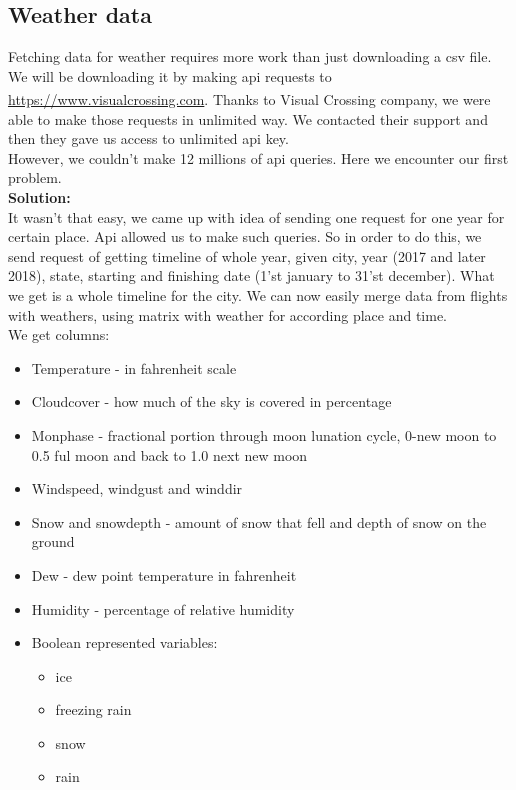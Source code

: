 \documentclass{article}
\begin{document}
	\subsection{Weather data}
		Fetching data for weather requires more work than just downloading a csv file.
		We will be downloading it by making api requests to \url{https://www.visualcrossing.com}.
		Thanks to Visual Crossing\textsuperscript{\tiny\textregistered} company, we were able to make those requests in unlimited way.
		We contacted their support and then they gave us access to unlimited api key. 	\\
		However, we couldn't make 12 millions of api queries. Here we encounter
		our first problem.\\
		\textbf{Solution:}\\
		It wasn't that easy, we came up with idea of sending one request for one year for certain place.
		Api allowed us to make such queries.  So in order to do this, we send request of getting timeline of whole year,
		given city, year (2017 and later 2018), state, starting and finishing date (1'st january to 31'st december). What we get is a whole 					timeline
		for the city. We can now easily merge data from flights with weathers, using matrix with weather for 
		according place and time.\\

		We get columns:

			\begin{itemize}
\item Temperature - in fahrenheit scale
\item Cloudcover - how much of the sky is covered in percentage
\item Monphase - fractional portion through moon lunation cycle, 0-new moon to 0.5 ful moon and back to 1.0 next new moon
\item Windspeed, windgust and winddir
\item Snow and snowdepth - amount of snow that fell and depth of snow on the ground
\item Dew - dew point temperature in fahrenheit
\item Humidity - percentage of relative humidity
\item Boolean represented variables:
	\begin{itemize}
		\item ice
		\item freezing rain
		\item snow
		\item rain
	\end{itemize}
				
			\end{itemize}
\newpage
\end{document}
